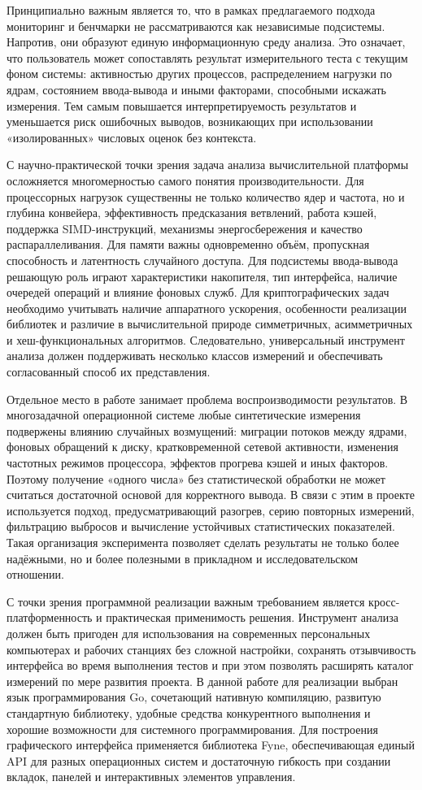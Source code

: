 Принципиально важным является то, что в рамках предлагаемого подхода мониторинг и бенчмарки не рассматриваются как независимые подсистемы. Напротив, они образуют единую информационную среду анализа. Это означает, что пользователь может сопоставлять результат измерительного теста с текущим фоном системы: активностью других процессов, распределением нагрузки по ядрам, состоянием ввода-вывода и иными факторами, способными искажать измерения. Тем самым повышается интерпретируемость результатов и уменьшается риск ошибочных выводов, возникающих при использовании «изолированных» числовых оценок без контекста.

С научно-практической точки зрения задача анализа вычислительной платформы осложняется многомерностью самого понятия производительности. Для процессорных нагрузок существенны не только количество ядер и частота, но и глубина конвейера, эффективность предсказания ветвлений, работа кэшей, поддержка SIMD-инструкций, механизмы энергосбережения и качество распараллеливания. Для памяти важны одновременно объём, пропускная способность и латентность случайного доступа. Для подсистемы ввода-вывода решающую роль играют характеристики накопителя, тип интерфейса, наличие очередей операций и влияние фоновых служб. Для криптографических задач необходимо учитывать наличие аппаратного ускорения, особенности реализации библиотек и различие в вычислительной природе симметричных, асимметричных и хеш-функциональных алгоритмов. Следовательно, универсальный инструмент анализа должен поддерживать несколько классов измерений и обеспечивать согласованный способ их представления.

Отдельное место в работе занимает проблема воспроизводимости результатов. В многозадачной операционной системе любые синтетические измерения подвержены влиянию случайных возмущений: миграции потоков между ядрами, фоновых обращений к диску, кратковременной сетевой активности, изменения частотных режимов процессора, эффектов прогрева кэшей и иных факторов. Поэтому получение «одного числа» без статистической обработки не может считаться достаточной основой для корректного вывода. В связи с этим в проекте используется подход, предусматривающий разогрев, серию повторных измерений, фильтрацию выбросов и вычисление устойчивых статистических показателей. Такая организация эксперимента позволяет сделать результаты не только более надёжными, но и более полезными в прикладном и исследовательском отношении.

С точки зрения программной реализации важным требованием является кросс-платформенность и практическая применимость решения. Инструмент анализа должен быть пригоден для использования на современных персональных компьютерах и рабочих станциях без сложной настройки, сохранять отзывчивость интерфейса во время выполнения тестов и при этом позволять расширять каталог измерений по мере развития проекта. В данной работе для реализации выбран язык программирования Go, сочетающий нативную компиляцию, развитую стандартную библиотеку, удобные средства конкурентного выполнения и хорошие возможности для системного программирования. Для построения графического интерфейса применяется библиотека Fyne, обеспечивающая единый API для разных операционных систем и достаточную гибкость при создании вкладок, панелей и интерактивных элементов управления.

